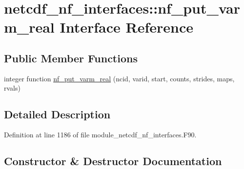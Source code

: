 \hypertarget{interfacenetcdf__nf__interfaces_1_1nf__put__varm__real}{}\section{netcdf\+\_\+nf\+\_\+interfaces\+:\+:nf\+\_\+put\+\_\+varm\+\_\+real Interface Reference}
\label{interfacenetcdf__nf__interfaces_1_1nf__put__varm__real}
\subsection*{Public Member Functions}
\begin{DoxyCompactItemize}
\item 
integer function \hyperlink{interfacenetcdf__nf__interfaces_1_1nf__put__varm__real_ac8b245cd43b53111ce23f12636e7e0a4}{nf\+\_\+put\+\_\+varm\+\_\+real} (ncid, varid, start, counts, strides, maps, rvals)
\end{DoxyCompactItemize}


\subsection{Detailed Description}


Definition at line 1186 of file module\+\_\+netcdf\+\_\+nf\+\_\+interfaces.\+F90.



\subsection{Constructor \& Destructor Documentation}
\mbox{\label{interfacenetcdf__nf__interfaces_1_1nf__put__varm__real_ac8b245cd43b53111ce23f12636e7e0a4}} 
